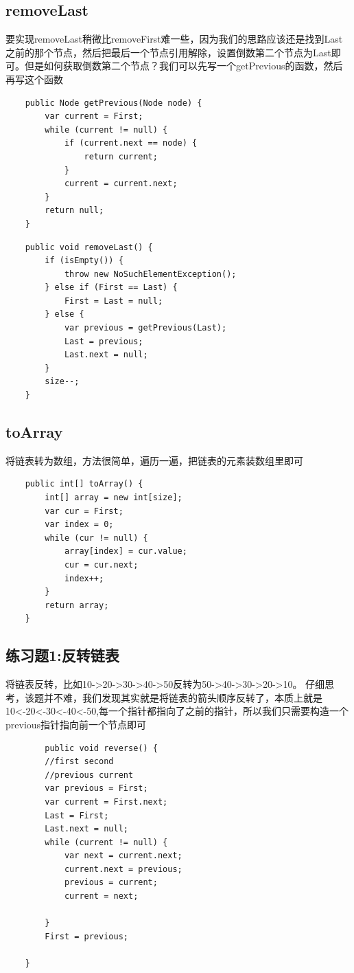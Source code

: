 \documentclass[
	11pt,
	fleqn,
	a4paper,
]{LegrandOrangeBook}
\begin{document}
\subsection{removeLast}
要实现removeLast稍微比removeFirst难一些，因为我们的思路应该还是找到Last之前的那个节点，然后把最后一个节点引用解除，设置倒数第二个节点为Last即可。但是如何获取倒数第二个节点？我们可以先写一个getPrevious的函数，然后再写这个函数
\begin{verbatim}
    public Node getPrevious(Node node) {
        var current = First;
        while (current != null) {
            if (current.next == node) {
                return current;
            }
            current = current.next;
        }
        return null;
    }
\end{verbatim}
\begin{verbatim}
    public void removeLast() {
        if (isEmpty()) {
            throw new NoSuchElementException();
        } else if (First == Last) {
            First = Last = null;
        } else {
            var previous = getPrevious(Last);
            Last = previous;
            Last.next = null;
        }
        size--;
    }
\end{verbatim}
\subsection{toArray}
将链表转为数组，方法很简单，遍历一遍，把链表的元素装数组里即可
\begin{verbatim}
    public int[] toArray() {
        int[] array = new int[size];
        var cur = First;
        var index = 0;
        while (cur != null) {
            array[index] = cur.value;
            cur = cur.next;
            index++;
        }
        return array;
    }
\end{verbatim}
\subsection{练习题1:反转链表}
\begin{example}
	将链表反转，比如10->20->30->40->50反转为50->40->30->20->10。
	仔细思考，该题并不难，我们发现其实就是将链表的箭头顺序反转了，本质上就是10<-20<-30<-40<-50,每一个指针都指向了之前的指针，所以我们只需要构造一个previous指针指向前一个节点即可
	\begin{verbatim}
	    public void reverse() {
        //first second
        //previous current
        var previous = First;
        var current = First.next;
        Last = First;
        Last.next = null;
        while (current != null) {
            var next = current.next;
            current.next = previous;
            previous = current;
            current = next;

        }
        First = previous;

    }
\end{verbatim}
\end{example}
\end{document}
